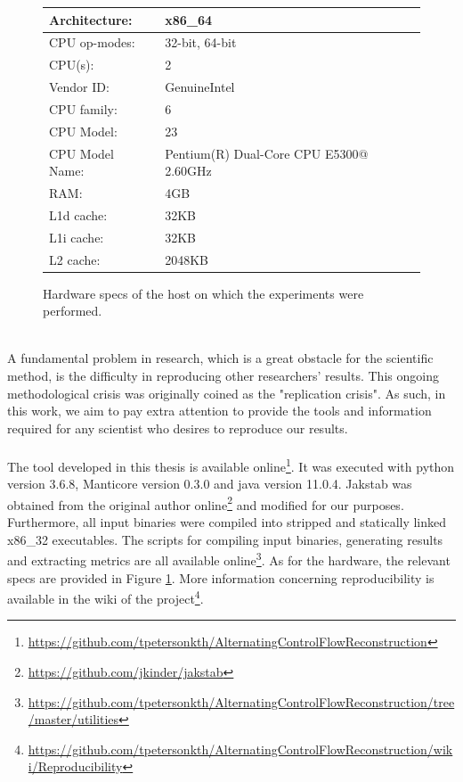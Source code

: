 \documentclass{kththesis}
\begin{document}
\begin{figure}[ht]
\begin{tabular}{|ll|}
\hline
Architecture:   & x86\_64                                 \\ \hline
CPU op-modes: & 32-bit, 64-bit                            \\ \hline
CPU(s):         & 2                                       \\ \hline
Vendor ID:      & GenuineIntel                            \\ \hline
CPU family:     & 6                                       \\ \hline
CPU Model:      & 23                                      \\ \hline
CPU Model Name: & Pentium(R) Dual-Core CPU E5300@ 2.60GHz \\ \hline
RAM:            & 4GB                                     \\ \hline%
L1d cache:      & 32KB                                    \\ \hline
L1i cache:      & 32KB                                    \\ \hline
L2 cache:       & 2048KB                                  \\ \hline
\end{tabular}
\caption{Hardware specs of the host on which the experiments were performed.}
\label{fig:HWspecs}
\end{figure}
\noindent
\\ 
A fundamental problem in research, which is a great obstacle for the scientific method, is the difficulty in reproducing other researchers' results. This ongoing methodological crisis was originally coined as the "replication crisis"\cite{replicability}. As such, in this work, we aim to pay extra attention to provide the tools and information required for any scientist who desires to reproduce our results. 
\\ \\
The tool developed in this thesis is available online\footnote{\url{https://github.com/tpetersonkth/AlternatingControlFlowReconstruction}}. It was executed with python version 3.6.8, Manticore version 0.3.0 and java version 11.0.4. Jakstab was obtained from the original author online\footnote{\url{https://github.com/jkinder/jakstab}} and modified for our purposes. Furthermore, all input binaries were compiled into stripped and statically linked x86\_32 executables. The scripts for compiling input binaries, generating results and extracting metrics are all available online\footnote{\url{https://github.com/tpetersonkth/AlternatingControlFlowReconstruction/tree/master/utilities}}. As for the hardware, the relevant specs are provided in Figure \ref{fig:HWspecs}. More information concerning reproducibility is available in the wiki of the project\footnote{\url{https://github.com/tpetersonkth/AlternatingControlFlowReconstruction/wiki/Reproducibility}}.
\end{document}
